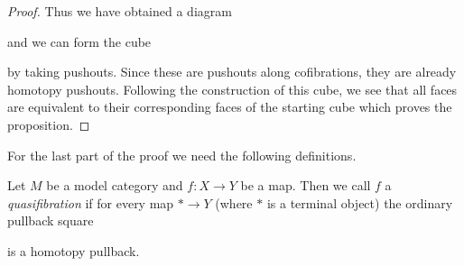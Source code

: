 \begin{prop}
\begin{proof}
        Thus we have obtained a diagram
        \begin{center}
        \end{center}
        and we can form the cube 
        \begin{center}
        \end{center}
        by taking pushouts.
        Since these are pushouts along cofibrations, they are already homotopy pushouts. 
        Following the construction of this cube, we see that all faces are equivalent to their corresponding faces of the starting cube which proves the proposition.
    \end{proof}
\end{prop}
For the last part of the proof we need the following definitions.
\begin{definition}[Quasifibration]
    Let $M$ be a model category and $f\colon X\to Y$ be a map.
    Then we call $f$ a \emph{quasifibration} if for every map $*\to Y$ (where $*$ is a terminal object) the ordinary pullback square
    \begin{center}
    \end{center}
    is a homotopy pullback.
\end{definition}
